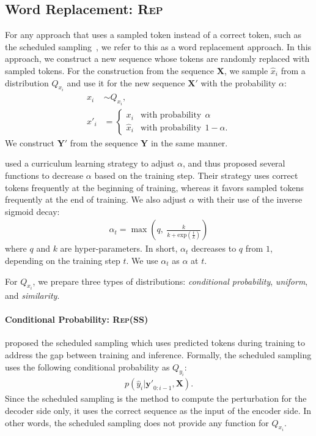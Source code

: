 \documentclass[11pt]{article}
\newcommand{\parass}{\textsc{Rep(SS)}}
\begin{document}
\subsection{Word Replacement: \textsc{Rep}}
For any approach that uses a sampled token instead of a correct token, such as the scheduled sampling~\cite{NIPS2015_5956}, we refer to this as a word replacement approach.
In this approach, we construct a new sequence whose tokens are randomly replaced with sampled tokens.
For the construction from the sequence $\bm{X}$, we sample $\hat{x}_{i}$ from a distribution $Q_{x_{i}}$ and use it for the new sequence $\bm{X}'$ with the probability $\alpha$:
\begin{align}
  \hat{x}_i &\sim Q_{x_{i}},\\
 x'_i &= \begin{cases}
   \label{eq:word_replacement}
   x_i  &\textrm{with probability} \ \ \alpha \\
   \hat{x}_i &\textrm{with probability} \ \ 1 - \alpha.
  \end{cases}
\end{align}
We construct $\bm{Y}'$ from the sequence $\bm{Y}$ in the same manner.

 used a curriculum learning strategy to adjust $\alpha$, and thus proposed several functions to decrease $\alpha$ based on the training step.
Their strategy uses correct tokens frequently at the beginning of training, whereas it favors sampled tokens frequently at the end of training.
We also adjust $\alpha$ with their use of the inverse sigmoid decay:
\begin{align}
 \alpha_t = \max \left(q, \ \frac{k}{k + \mathrm{exp}({\frac{t}{k}})} \right)
\end{align}
where $q$ and $k$ are hyper-parameters.
In short, $\alpha_t$ decreases to $q$ from $1$, depending on the training step $t$.
We use $\alpha_t$ as $\alpha$ at $t$.

For $Q_{x_{i}}$, we prepare three types of distributions: \textit{conditional probability}, \textit{uniform}, and \textit{similarity}.


\paragraph{Conditional Probability: \parass{}}
 proposed the scheduled sampling which uses predicted tokens during training to address the gap between training and inference.
Formally, the scheduled sampling uses the following conditional probability as $Q_{y_{i}}$:
\begin{align}
 \label{eq:shceduled_sampling}
 p(\hat{y}_i | \bm{y'}_{0:i-1}, \bm{X}).
\end{align}
Since the scheduled sampling is the method to compute the perturbation for the decoder side only, it uses the correct sequence as the input of the encoder side.
In other words, the scheduled sampling does not provide any function for $Q_{x_{i}}$.
\end{document}
